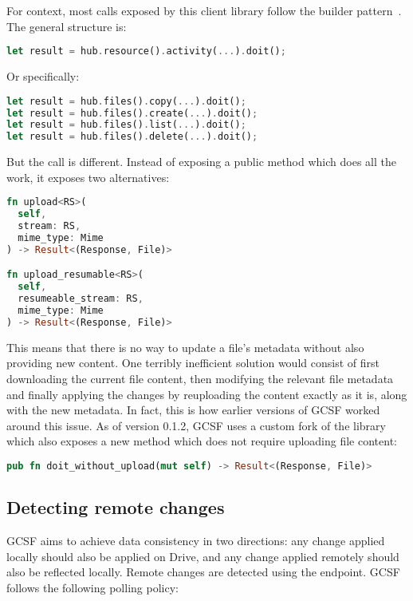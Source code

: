 For context, most calls exposed by this client library follow the builder pattern~\cite{gof}. The general structure is:

\begin{lstlisting}[language=Rust, frame=single]
let result = hub.resource().activity(...).doit();
\end{lstlisting}

Or specifically:

\begin{lstlisting}[language=Rust, frame=single]
let result = hub.files().copy(...).doit();
let result = hub.files().create(...).doit();
let result = hub.files().list(...).doit();
let result = hub.files().delete(...).doit();
\end{lstlisting}

But the  call is different. Instead of exposing a public  method which does all the work, it exposes two alternatives:

\begin{lstlisting}[language=Rust, frame=single]
fn upload<RS>(
  self,
  stream: RS,
  mime_type: Mime
) -> Result<(Response, File)>

fn upload_resumable<RS>(
  self,
  resumeable_stream: RS,
  mime_type: Mime
) -> Result<(Response, File)>
\end{lstlisting}

This means that there is no way to update a file's metadata without also providing new content. One terribly inefficient solution would consist of first downloading the current file content, then modifying the relevant file metadata and finally applying the changes by reuploading the content exactly as it is, along with the new metadata. In fact, this is how earlier versions of GCSF worked around this issue. As of version 0.1.2, GCSF uses a custom fork\cite{google_drive3_fork} of the library which also exposes a new method which does not require uploading file content:

\begin{lstlisting}[language=Rust, frame=single]
pub fn doit_without_upload(mut self) -> Result<(Response, File)>
\end{lstlisting}

\subsection{Detecting remote changes}

GCSF aims to achieve data consistency in two directions: any change applied locally should also be applied on Drive, and any change applied remotely should also be reflected locally. Remote changes are detected using the  endpoint. GCSF follows the following polling policy:

